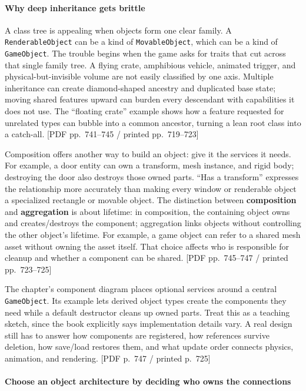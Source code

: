 \paragraph{Why deep inheritance gets brittle}\label{06-engine-ii-ch041-why-deep-inheritance-gets-brittle}

A class tree is appealing when objects form one clear family. A \texttt{RenderableObject} can be a kind of \texttt{MovableObject}, which can be a kind of \texttt{GameObject}. The trouble begins when the game asks for traits that cut across that single family tree. A flying crate, amphibious vehicle, animated trigger, and physical-but-invisible volume are not easily classified by one axis. Multiple inheritance can create diamond-shaped ancestry and duplicated base state; moving shared features upward can burden every descendant with capabilities it does not use. The ``floating crate'' example shows how a feature requested for unrelated types can bubble into a common ancestor, turning a lean root class into a catch-all. {[}PDF pp.~741--745 / printed pp.~719--723{]}

Composition offers another way to build an object: give it the services it needs. For example, a door entity can own a transform, mesh instance, and rigid body; destroying the door also destroys those owned parts. ``Has a transform'' expresses the relationship more accurately than making every window or renderable object a specialized rectangle or movable object. The distinction between \textbf{composition} and \textbf{aggregation} is about lifetime: in composition, the containing object owns and creates/destroys the component; aggregation links objects without controlling the other object's lifetime. For example, a game object can refer to a shared mesh asset without owning the asset itself. That choice affects who is responsible for cleanup and whether a component can be shared. {[}PDF pp.~745--747 / printed pp.~723--725{]}

The chapter's component diagram places optional services around a central \texttt{GameObject}. Its example lets derived object types create the components they need while a default destructor cleans up owned parts. Treat this as a teaching sketch, since the book explicitly says implementation details vary. A real design still has to answer how components are registered, how references survive deletion, how save/load restores them, and what update order connects physics, animation, and rendering. {[}PDF p.~747 / printed p.~725{]}

\paragraph{Choose an object architecture by deciding who owns the connections}\label{06-engine-ii-ch041-choose-an-object-architecture-by-deciding-who-owns-the-connections}

